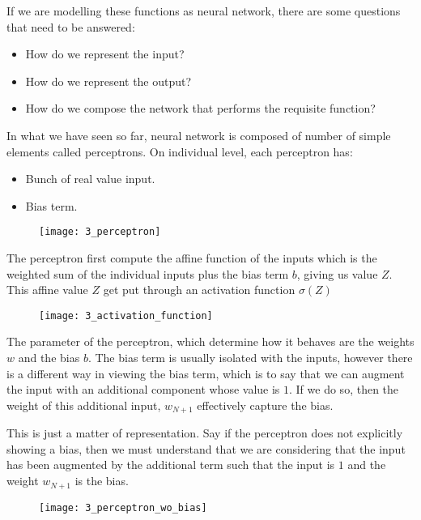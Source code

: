 \hfill\break
If we are modelling these functions as neural network, there are some questions that need to be answered:
\begin{itemize}
	\item How do we represent the input?
	\item How do we represent the output?
	\item How do we compose the network that performs the requisite function?
\end{itemize}

\hfill\break
In what we have seen so far, neural network is composed of number of simple elements called perceptrons. On individual level, each perceptron has:
\begin{itemize}
	\item Bunch of real value input.
	\item Bias term.
\end{itemize}

\begin{figure}[H]
	\centering
	\texttt{[image: 3\_perceptron]}
\end{figure}

\hfill\break
The perceptron first compute the affine function of the inputs which is the weighted sum of the individual inputs plus the bias term $b$, giving us value $Z$. This affine value $Z$ get put through an activation function $\sigma(Z)$

\begin{figure}[H]
	\centering
	\texttt{[image: 3\_activation\_function]}
\end{figure}

\hfill\break
The parameter of the perceptron, which determine how it behaves are the weights
$w$ and the bias $b$. The bias term is usually isolated with the inputs, however
there is a different way in viewing the bias term, which is to say that we can
augment the input with an additional component whose value is $1$. If we do so,
then the weight of this additional input, $w_{N+1}$ effectively capture the
bias.

This is just a matter of representation. Say if the perceptron does not
explicitly showing a bias, then we must understand that we are considering that
the input has been augmented by the additional term such that the input is $1$ and
the weight $w_{N+1}$ is the bias.

\begin{figure}[H]
	\centering
	\texttt{[image: 3\_perceptron\_wo\_bias]}
\end{figure}


